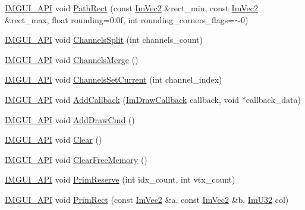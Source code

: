 \begin{DoxyCompactItemize}
\item 
\mbox{\hyperlink{imgui_8h_a43829975e84e45d1149597467a14bbf5}{I\+M\+G\+U\+I\+\_\+\+A\+PI}} void \mbox{\hyperlink{struct_im_draw_list_a1b63e7c7bbb70f8a7be2b227a3d3f802}{Path\+Rect}} (const \mbox{\hyperlink{struct_im_vec2}{Im\+Vec2}} \&rect\+\_\+min, const \mbox{\hyperlink{struct_im_vec2}{Im\+Vec2}} \&rect\+\_\+max, float rounding=0.\+0f, int rounding\+\_\+corners\+\_\+flags=$\sim$0)
\item 
\mbox{\hyperlink{imgui_8h_a43829975e84e45d1149597467a14bbf5}{I\+M\+G\+U\+I\+\_\+\+A\+PI}} void \mbox{\hyperlink{struct_im_draw_list_a426f124ba049bed2d38c850c65f9f917}{Channels\+Split}} (int channels\+\_\+count)
\item 
\mbox{\hyperlink{imgui_8h_a43829975e84e45d1149597467a14bbf5}{I\+M\+G\+U\+I\+\_\+\+A\+PI}} void \mbox{\hyperlink{struct_im_draw_list_a2ed82c3f663cda520c90c55b94196274}{Channels\+Merge}} ()
\item 
\mbox{\hyperlink{imgui_8h_a43829975e84e45d1149597467a14bbf5}{I\+M\+G\+U\+I\+\_\+\+A\+PI}} void \mbox{\hyperlink{struct_im_draw_list_a7de44b9fdfce65f32063ecad9306a191}{Channels\+Set\+Current}} (int channel\+\_\+index)
\item 
\mbox{\hyperlink{imgui_8h_a43829975e84e45d1149597467a14bbf5}{I\+M\+G\+U\+I\+\_\+\+A\+PI}} void \mbox{\hyperlink{struct_im_draw_list_a14073d60ef9db9dc663dc7717a4893a5}{Add\+Callback}} (\mbox{\hyperlink{imgui_8h_a232a477233f9e3ab7640720bf94674de}{Im\+Draw\+Callback}} callback, void $\ast$callback\+\_\+data)
\item 
\mbox{\hyperlink{imgui_8h_a43829975e84e45d1149597467a14bbf5}{I\+M\+G\+U\+I\+\_\+\+A\+PI}} void \mbox{\hyperlink{struct_im_draw_list_a846714bb0321c6f1f908767abc8559e6}{Add\+Draw\+Cmd}} ()
\item 
\mbox{\hyperlink{imgui_8h_a43829975e84e45d1149597467a14bbf5}{I\+M\+G\+U\+I\+\_\+\+A\+PI}} void \mbox{\hyperlink{struct_im_draw_list_ac422590c71dc5593aea52f65793aee81}{Clear}} ()
\item 
\mbox{\hyperlink{imgui_8h_a43829975e84e45d1149597467a14bbf5}{I\+M\+G\+U\+I\+\_\+\+A\+PI}} void \mbox{\hyperlink{struct_im_draw_list_a8b2686e006f57c554b709dfc47e2ad63}{Clear\+Free\+Memory}} ()
\item 
\mbox{\hyperlink{imgui_8h_a43829975e84e45d1149597467a14bbf5}{I\+M\+G\+U\+I\+\_\+\+A\+PI}} void \mbox{\hyperlink{struct_im_draw_list_a879aa38dbfb0344e3e023d65c002c7d7}{Prim\+Reserve}} (int idx\+\_\+count, int vtx\+\_\+count)
\item 
\mbox{\hyperlink{imgui_8h_a43829975e84e45d1149597467a14bbf5}{I\+M\+G\+U\+I\+\_\+\+A\+PI}} void \mbox{\hyperlink{struct_im_draw_list_ae2be093563f1d20b8190b7c423113925}{Prim\+Rect}} (const \mbox{\hyperlink{struct_im_vec2}{Im\+Vec2}} \&a, const \mbox{\hyperlink{struct_im_vec2}{Im\+Vec2}} \&b, \mbox{\hyperlink{imgui_8h_a118cff4eeb8d00e7d07ce3d6460eed36}{Im\+U32}} col)

\end{DoxyCompactItemize}
